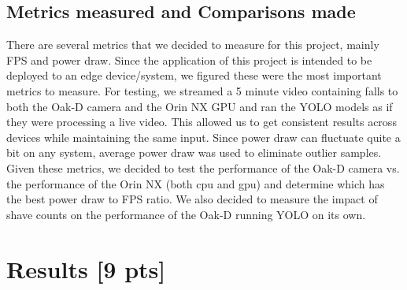\documentclass[sigconf,authorversion,nonacm]{acmart}
\begin{document}
\subsection{Metrics measured and Comparisons made}
There are several metrics that we decided to measure for this project, mainly FPS and power draw. Since the application of this project is intended to be deployed to an edge device/system, we figured these were the most important metrics to measure. For testing, we streamed a 5 minute video containing falls to both the Oak-D camera and the Orin NX GPU and ran the YOLO models as if they were processing a live video. This allowed us to get consistent results across devices while maintaining the same input. Since power draw can fluctuate quite a bit on any system, average power draw was used to eliminate outlier samples. Given these metrics, we decided to test the performance of the Oak-D camera vs. the performance of the Orin NX (both cpu and gpu) and determine which has the best power draw to FPS ratio. We also decided to measure the impact of shave counts on the performance of the Oak-D running YOLO on its own.


\section{Results {\small {[9 pts]}}}  

\end{document}
